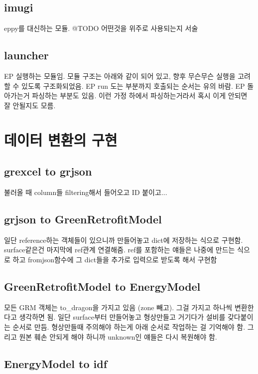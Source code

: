 \subsection{imugi}
eppy를 대신하는 모듈. @TODO 어떤것을 위주로 사용되는지 서술 
\subsection{launcher}
EP 실행하는 모듈임. 모듈 구조는 아래와 같이 되어 있고, 향후 무슨무슨 실행을 고려할 수 있도록 구조화되었음. EP run 도는 부분까지 호출되는 순서는 유의 바람.
EP 돌아가는거 파싱하는 부분도 있음. 이런 가정 하에서 파싱하는거라서 혹시 이게 안되면 잘 안될지도 모름.


\section{데이터 변환의 구현}
\subsection{grexcel to grjson}
불러올 때 column들 filtering해서 들어오고 ID 붙이고...

\subsection{grjson to GreenRetrofitModel}
일단 reference하는 객체들이 있으니까 만들어놓고 dict에 저장하는 식으로 구현함. surface같은건 마지막에 ref관계 연결해줌. ref를 포함하는 얘들은 나중에 만드는 식으로 하고 fromjson함수에 그 dict들을 추가로 입력으로 받도록 해서 구현함

\subsection{GreenRetrofitModel to EnergyModel}
모든 GRM 객체는 to\_dragon을 가지고 있음 (zone 빼고). 그걸 가지고 하나씩 변환한다고 생각하면 됨. 일단 surface부터 만들어놓고 형상만들고 거기다가 설비를 갖다붙이는 순서로 만듬. 형상만들때 주의해야 하는게 아래 순서로 작업하는 걸 기억해야 함. 그리고 원본 훼손 안되게 해야 하니까 unknown인 얘들은 다시 복원해야 함.

\subsection{EnergyModel to idf}

